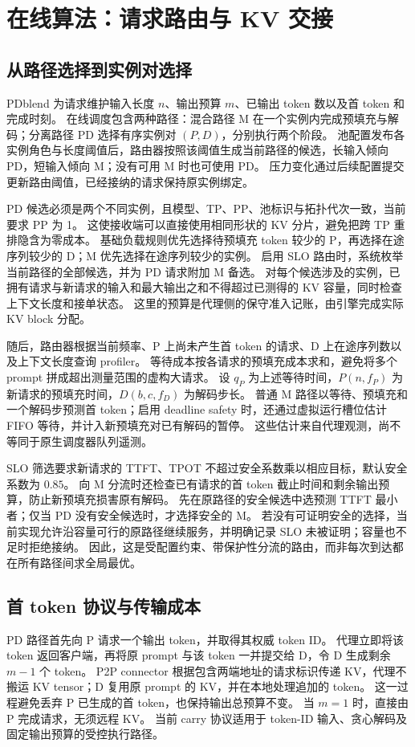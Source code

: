 \section{在线算法：请求路由与 KV 交接}

\subsection{从路径选择到实例对选择}
PDblend 为请求维护输入长度 $n$、输出预算 $m$、已输出 token 数以及首 token 和完成时刻。
在线调度包含两种路径：混合路径 M 在一个实例内完成预填充与解码；分离路径 PD 选择有序实例对 $(P,D)$，分别执行两个阶段。
池配置发布各实例角色与长度阈值后，路由器按照该阈值生成当前路径的候选，长输入倾向 PD，短输入倾向 M；没有可用 M 时也可使用 PD。
压力变化通过后续配置提交更新路由阈值，已经接纳的请求保持原实例绑定。

PD 候选必须是两个不同实例，且模型、TP、PP、池标识与拓扑代次一致，当前要求 PP 为 1。
这使接收端可以直接使用相同形状的 KV 分片，避免把跨 TP 重排隐含为零成本。
基础负载规则优先选择待预填充 token 较少的 P，再选择在途序列较少的 D；M 优先选择在途序列较少的实例。
启用 SLO 路由时，系统枚举当前路径的全部候选，并为 PD 请求附加 M 备选。
对每个候选涉及的实例，已拥有请求与新请求的输入和最大输出之和不得超过已测得的 KV 容量，同时检查上下文长度和接单状态。
这里的预算是代理侧的保守准入记账，由引擎完成实际 KV block 分配。

随后，路由器根据当前频率、P 上尚未产生首 token 的请求、D 上在途序列数以及上下文长度查询 profiler。
等待成本按各请求的预填充成本求和，避免将多个 prompt 拼成超出测量范围的虚构大请求。
设 $q_P$ 为上述等待时间，$P(n,f_P)$ 为新请求的预填充时间，$D(b,c,f_D)$ 为解码步长。
普通 M 路径以等待、预填充和一个解码步预测首 token；启用 deadline safety 时，还通过虚拟运行槽位估计 FIFO 等待，并计入新预填充对已有解码的暂停。
这些估计来自代理观测，尚不等同于原生调度器队列遥测。

SLO 筛选要求新请求的 TTFT、TPOT 不超过安全系数乘以相应目标，默认安全系数为 $0.85$。
向 M 分流时还检查已有请求的首 token 截止时间和剩余输出预算，防止新预填充损害原有解码。
先在原路径的安全候选中选预测 TTFT 最小者；仅当 PD 没有安全候选时，才选择安全的 M。
若没有可证明安全的选择，当前实现允许沿容量可行的原路径继续服务，并明确记录 SLO 未被证明；容量也不足时拒绝接纳。
因此，这是受配置约束、带保护性分流的路由，而非每次到达都在所有路径间求全局最优。

\subsection{首 token 协议与传输成本}
PD 路径首先向 P 请求一个输出 token，并取得其权威 token ID。
代理立即将该 token 返回客户端，再将原 prompt 与该 token 一并提交给 D，令 D 生成剩余 $m-1$ 个 token。
P2P connector 根据包含两端地址的请求标识传递 KV，代理不搬运 KV tensor；D 复用原 prompt 的 KV，并在本地处理追加的 token。
这一过程避免丢弃 P 已生成的首 token，也保持输出总预算不变。
当 $m=1$ 时，直接由 P 完成请求，无须远程 KV。
当前 carry 协议适用于 token-ID 输入、贪心解码及固定输出预算的受控执行路径。

